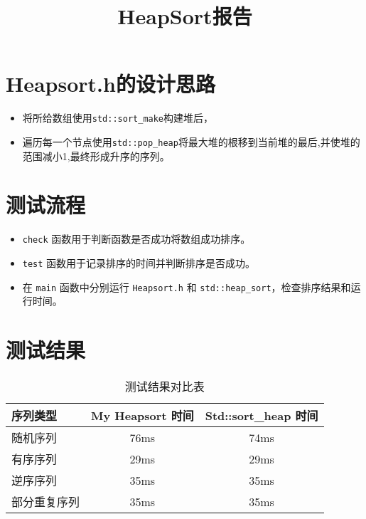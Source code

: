 \documentclass{article}
\title{HeapSort报告}
\author{}
\date{}
\begin{document}
\maketitle
\section{Heapsort.h的设计思路}
\begin{itemize}
    \item 将所给数组使用\texttt{std::sort\_make}构建堆后，
    \item 遍历每一个节点使用\texttt{std::pop\_heap}将最大堆的根移到当前堆的最后,并使堆的范围减小1,最终形成升序的序列。
\end{itemize}
\section{测试流程}
\begin{itemize}
    \item \texttt{check} 函数用于判断函数是否成功将数组成功排序。
    \item \texttt{test} 函数用于记录排序的时间并判断排序是否成功。
    \item 在 \texttt{main} 函数中分别运行 \texttt{Heapsort.h} 和 \texttt{std::heap\_sort}，检查排序结果和运行时间。
\end{itemize}
\section{测试结果}
\begin{table}[h!]
    \centering
    \begin{tabular}{|l|c|c|}
    \hline
    序列类型 & My Heapsort 时间 & Std::sort\_heap 时间 \\
    \hline  
    随机序列 & 76ms & 74ms \\
    \hline 
    有序序列 & 29ms & 29ms \\
    \hline
    逆序序列 & 35ms & 35ms \\
    \hline
    部分重复序列 & 35ms & 35ms \\
    \hline
    \end{tabular}
    \caption{测试结果对比表}
    \end{table}
\end{document}
